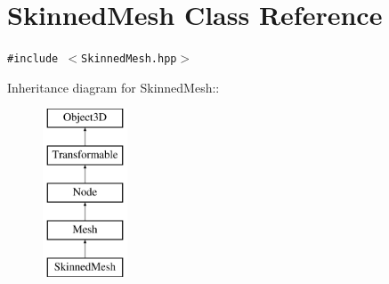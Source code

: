 \hypertarget{classm3g_1_1SkinnedMesh}{
\section{SkinnedMesh Class Reference}
\label{classm3g_1_1SkinnedMesh}
}
{\tt \#include $<$SkinnedMesh.hpp$>$}

Inheritance diagram for SkinnedMesh::\begin{figure}[H]
\begin{center}
\leavevmode
\includegraphics[height=5cm]{classm3g_1_1SkinnedMesh}
\end{center}
\end{figure}
